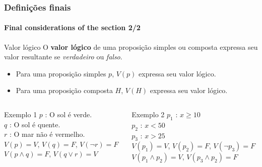 \documentclass[10pt]{beamer}
\begin{document}
\begin{frame}[t]
    \frametitle{Definições finais}
    \framesubtitle{Final considerations of the section 2/2}
    \small
    \begin{block}{Valor lógico}
        O \textbf{valor lógico} de uma proposição simples ou composta expressa seu valor resultante se \textit{verdadeiro} ou \textit{falso}.
        \begin{itemize}
            \item Para uma proposição simples $p$, $V(p)$ expressa seu valor lógico.
            \item Para uma proposição composta $H$, $V(H)$ expressa seu valor lógico.
        \end{itemize}
    \end{block}
    \begin{columns}[T]
        \begin{column}{.5\textwidth}
            \begin{exampleblock}{Exemplo 1}
                \quad $p$ : O sol é verde. \\
                \quad $q$ : O sol é quente. \\
                \quad $r$ : O mar não é vermelho.\\[4pt]
                \quad $V(p) = V$, $V(q) = F$, $V(\lnot r)=F$ \\
                \quad $V(p \land q) = F$, \quad $V(q \lor r) = V$
            \end{exampleblock}
        \end{column}
        \begin{column}{.5\textwidth}
            \begin{exampleblock}{Exemplo 2}
                \quad $p_1$ : $x \geq 10$   \\
                \quad $p_2$ : $x < 50$\\
                \quad $p_3$ : $x > 25$ \\[4pt]
                $V(p_1) = V$, $V(p_2) = F$, $V(\lnot p_3)=F$ \\
                \quad $V(p_1 \land p_2) = V$, $V(p_3 \land p_2) = F$
            \end{exampleblock}
        \end{column}
    \end{columns}
\end{frame}
%
\end{document}
